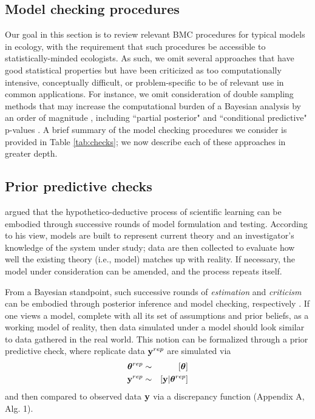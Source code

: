 \documentclass[12pt,english]{article}
\begin{document}
\begin{spacing}{1.9}
\section{Model checking procedures}

Our goal in this section is to review relevant BMC
procedures for typical models in ecology, with the requirement that
such procedures be accessible to statistically-minded ecologists.  As
such, we omit several approaches that have good statistical properties
but have been criticized \citep[e.g.,][]{Johnson2007b,Zhang2014} as
too computationally intensive, conceptually difficult, or
problem-specific to be of relevant use in common applications.  For
instance, we omit consideration of double sampling methods that may
increase the computational burden of a Bayesian analysis by an order
of magnitude \citep{Johnson2007b}, including ``partial posterior" and
``conditional predictive" p-values \citep[see
e.g.,][]{BayarriBerger1999,RobinsEtAl2000,BayarriCastellanos2007}.  A brief summary of 
the model checking procedures we consider is provided in Table \ref{tab:checks}; we now describe
each of these approaches in greater depth.

\subsection{Prior predictive checks}

\citet{Box1980} argued that the hypothetico-deductive process of
scientific learning can be embodied through successive rounds of model
formulation and testing. According to his view, models are built to
represent current theory and an investigator's knowledge of the system
under study; data are then collected to evaluate how well the existing
theory (i.e., model) matches up with reality.  If necessary, the model
under consideration can be amended, and the process repeats itself.

From a Bayesian standpoint, such successive rounds of
\textit{estimation} and \textit{criticism} can be embodied through
posterior inference and model checking, respectively \citep{Box1980}.
If one views a model, complete with all its set of assumptions and
prior beliefs, as a working model of reality, then data simulated
under a model should look similar to data gathered in the real world.
This notion can be formalized through a prior predictive check, where
replicate data ${\bf y}^{rep}$ are simulated via
\begin{eqnarray}
  \label{eq:prior}
  \boldsymbol{\theta}^{rep} & \sim & [\boldsymbol{\theta}] \\
  {\bf y}^{rep} & \sim & [{\bf y}|\boldsymbol{\theta}^{rep}] \nonumber
\end{eqnarray}
and then compared to observed data ${\bf y}$ via a discrepancy function
(Appendix A, Alg. 1).


\end{spacing}
\end{document}
